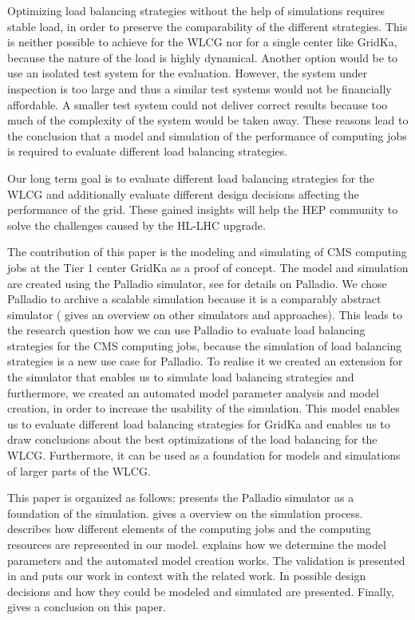 \documentclass{webofc}
\begin{document}
Optimizing load balancing strategies without the help of simulations requires stable load, in order to preserve the comparability of the different strategies. This is neither possible to achieve for the WLCG nor for a single center like GridKa, because the nature of the load is highly dynamical. Another option would be to use an isolated test system for the evaluation. However, the system under inspection is too large and thus a similar test systems would not be financially affordable. A smaller test system could not deliver correct results because too much of the complexity of the system would be taken away.
These reasons lead to the conclusion that a model and simulation of the performance of computing jobs is required to evaluate different load balancing strategies.

Our long term goal is to evaluate different load balancing strategies for the WLCG and additionally evaluate different design decisions affecting the performance of the grid. These gained insights will help the HEP community to solve the challenges caused by the HL-LHC upgrade.

The contribution of this paper is the modeling and simulating of CMS computing jobs at the Tier 1 center GridKa as a proof of concept.
The model and simulation are created using the Palladio simulator, see  for details on Palladio. We chose Palladio to archive a scalable simulation because it is a comparably abstract simulator ( gives an overview on other simulators and approaches).
This leads to the research question how we can use Palladio to evaluate load balancing strategies for the CMS computing jobs, because the simulation of load balancing strategies is a new use case for Palladio. To realise it we created an extension for the simulator that enables us to simulate load balancing strategies and furthermore, we created an automated model parameter analysis and model creation, in order to increase the usability of the simulation.
This model enables us to evaluate different load balancing strategies for GridKa and enables us to draw conclusions about the best optimizations of the load balancing for the WLCG. Furthermore, it can be used as a foundation for models and simulations of larger parts of the WLCG.


This paper is organized as follows:  presents the Palladio simulator as a foundation of the simulation.  gives a overview on the simulation process.  describes how different elements of the computing jobs and the computing resources are represented in our model.  explains how we determine the model parameters and the automated model creation works. The validation is presented in  and  puts our work in context with the related work. In  possible design decisions and how they could be modeled and simulated are presented. Finally,  gives a conclusion on this paper.
\end{document}
